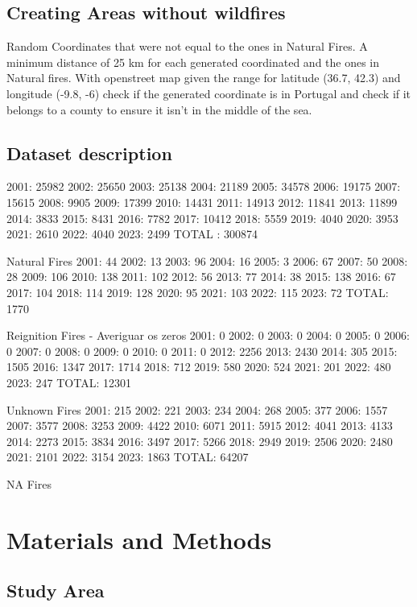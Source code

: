 \subsection{Creating Areas without wildfires}

Random Coordinates that were not equal to the ones in Natural Fires. A minimum distance of 25 km for each generated coordinated and the ones in Natural fires. With openstreet map given the range for latitude (36.7, 42.3) and longitude (-9.8, -6) check if the generated coordinate is in Portugal and check if it belongs to a county to ensure it isn't in the middle of the sea.

\subsection{Dataset description}
2001: 25982
2002: 25650
2003: 25138
2004: 21189
2005: 34578
2006: 19175
2007: 15615
2008: 9905
2009: 17399
2010: 14431
2011: 14913
2012: 11841
2013: 11899
2014: 3833
2015: 8431
2016: 7782
2017: 10412
2018: 5559
2019: 4040
2020: 3953
2021: 2610
2022: 4040
2023: 2499
TOTAL : 300874

Natural Fires
2001: 44
2002: 13
2003: 96
2004: 16
2005: 3
2006: 67
2007: 50
2008: 28
2009: 106
2010: 138
2011: 102
2012: 56
2013: 77
2014: 38
2015: 138
2016: 67
2017: 104
2018: 114
2019: 128
2020: 95
2021: 103
2022: 115
2023: 72
TOTAL: 1770

Reignition Fires - Averiguar os zeros
2001: 0
2002: 0
2003: 0
2004: 0
2005: 0
2006: 0
2007: 0
2008: 0
2009: 0
2010: 0
2011: 0
2012: 2256
2013: 2430
2014: 305
2015: 1505
2016: 1347
2017: 1714
2018: 712
2019: 580
2020: 524
2021: 201
2022: 480
2023: 247
TOTAL: 12301

Unknown Fires
2001: 215
2002: 221
2003: 234
2004: 268
2005: 377
2006: 1557
2007: 3577
2008: 3253
2009: 4422
2010: 6071
2011: 5915
2012: 4041
2013: 4133
2014: 2273
2015: 3834
2016: 3497
2017: 5266
2018: 2949
2019: 2506
2020: 2480
2021: 2101
2022: 3154
2023: 1863
TOTAL: 64207

NA Fires


\section{Materials and Methods}

\subsection{Study Area}







